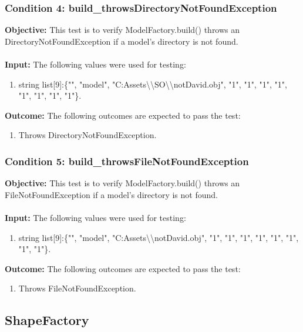 \documentclass[a4paper,12pt]{article}
\begin{document}
		\subsubsection{Condition 4: build\_throwsDirectoryNotFoundException}
			\textbf{Objective:} This test is to verify  ModelFactory.build() throws an DirectoryNotFoundException if a model's directory is not found.\\\\
			\textbf{Input:} The following values were used for testing:
				\begin{enumerate}
					\item string list[9]:\{"", "model", "C:Assets\textbackslash \textbackslash SO\textbackslash \textbackslash notDavid.obj", "1", "1", "1", "1", "1", "1", "1", "1"\}.
				\end{enumerate}
			\textbf{Outcome:} The following outcomes are expected to pass the test:
				\begin{enumerate}
					\item Throws DirectoryNotFoundException.
				\end{enumerate}
		\subsubsection{Condition 5: build\_throwsFileNotFoundException}
			\textbf{Objective:} This test is to verify  ModelFactory.build() throws an FileNotFoundException if a model's directory is not found.\\\\
			\textbf{Input:} The following values were used for testing:
				\begin{enumerate}
					\item string list[9]:\{"", "model", "C:Assets\textbackslash \textbackslash notDavid.obj", "1", "1", "1", "1", "1", "1", "1", "1"\}.
				\end{enumerate}
			\textbf{Outcome:} The following outcomes are expected to pass the test:
				\begin{enumerate}
					\item Throws FileNotFoundException.
				\end{enumerate}
	\subsection{ShapeFactory}
\end{document}
